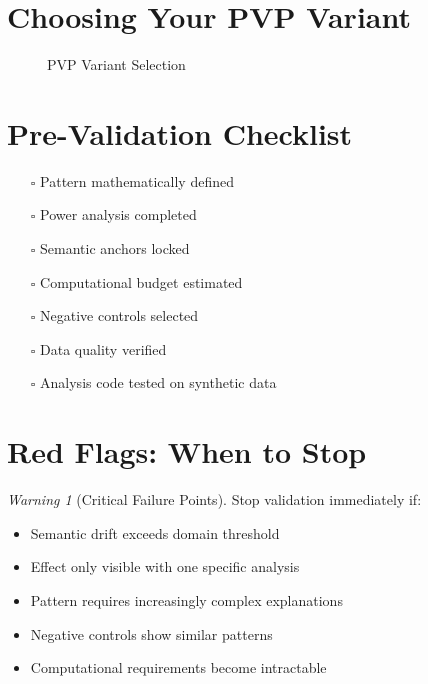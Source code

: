\documentclass[12pt,oneside]{memoir}
\theoremstyle{plain}
\theoremstyle{definition}
\theoremstyle{remark}
\newtheorem{warning}[theorem]{Warning}
\begin{document}
\section{Choosing Your PVP Variant}

\begin{figure}[h]
\centering
{}
\caption{PVP Variant Selection}
\end{figure}

\section{Pre-Validation Checklist}

\begin{itemize}
\item[$\square$] Pattern mathematically defined
\item[$\square$] Power analysis completed
\item[$\square$] Semantic anchors locked
\item[$\square$] Computational budget estimated
\item[$\square$] Negative controls selected
\item[$\square$] Data quality verified
\item[$\square$] Analysis code tested on synthetic data
\end{itemize}

\section{Red Flags: When to Stop}

\begin{warning}[Critical Failure Points]
Stop validation immediately if:
\begin{itemize}
\item Semantic drift exceeds domain threshold
\item Effect only visible with one specific analysis
\item Pattern requires increasingly complex explanations
\item Negative controls show similar patterns
\item Computational requirements become intractable
\end{itemize}
\end{warning}
\end{document}

